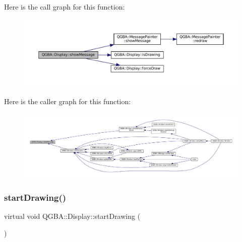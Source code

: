 Here is the call graph for this function\+:
\nopagebreak
\begin{figure}[H]
\begin{center}
\leavevmode
\includegraphics[width=350pt]{class_q_g_b_a_1_1_display_ab4e04e33416aafdc2a3455babf6bfdb4_cgraph}
\end{center}
\end{figure}
Here is the caller graph for this function\+:
\nopagebreak
\begin{figure}[H]
\begin{center}
\leavevmode
\includegraphics[width=350pt]{class_q_g_b_a_1_1_display_ab4e04e33416aafdc2a3455babf6bfdb4_icgraph}
\end{center}
\end{figure}
\mbox{\label{class_q_g_b_a_1_1_display_aa644c73fb7482b0d17be7ee88dae3fd0}} 
\subsubsection{\texorpdfstring{start\+Drawing()}{startDrawing()}}
{\footnotesize\ttfamily virtual void Q\+G\+B\+A\+::\+Display\+::start\+Drawing (\begin{DoxyParamCaption}\item[{std\+::shared\+\_\+ptr$<$ \mbox{\hyperlink{class_q_g_b_a_1_1_core_controller}{Core\+Controller}} $>$}]{ }\end{DoxyParamCaption})\hspace{0.3cm}{\ttfamily [pure virtual]}}



